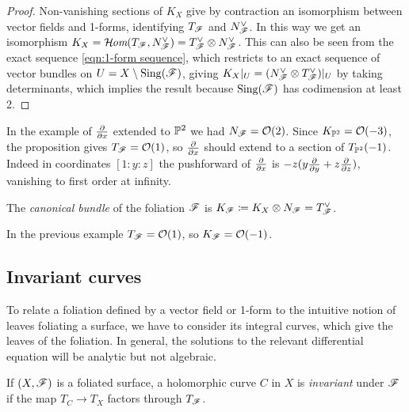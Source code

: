 \begin{proof}
    Non-vanishing sections of $K_X$ give by contraction an isomorphism between
    vector fields and 1-forms, identifying $T_\scrF$ and $N_\scrF^\vee$. In this
    way we get an isomorphism
    $K_X=\shHom(T_\scrF,N_\scrF^\vee)=T_\scrF^\vee\otimes N_\scrF^\vee$. This can also be
    seen from the exact sequence \cref{eqn:1-form sequence}, which restricts to
    an exact sequence of vector bundles on $U=X\setminus\Sing(\scrF)$, giving
    $K_X|_U=(N_\scrF^\vee\otimes T_\scrF^\vee)|_U$ by taking determinants, which
    implies the result because $\Sing(\scrF)$ has codimension at least 2.
\end{proof}

\begin{example}\label{ex:P2 tangent}
    In the example of $\pdv{}{x}$ extended to $\P^2$ we had $N_\scrF=\O(2)$.
    Since $K_{\P^2}=\O(-3)$, the proposition gives $T_\scrF=\O(1)$, so
    $\pdv{}{x}$ should extend to a section of $T_{\P^2}(-1)$. Indeed in
    coordinates $[1:y:z]$ the pushforward of $\pdv{}{x}$ is
    $-z(y\pdv{}{y}+z\pdv{}{z})$, vanishing to first order at infinity.
\end{example}

\begin{definition}
    The \emph{canonical bundle} of the foliation $\scrF$ is
    $K_\scrF\coloneqq K_X\otimes N_\scrF=T_\scrF^\vee$.
\end{definition}

\begin{example}
    In the previous example $T_\scrF=\O(1)$, so $K_\scrF=\O(-1)$.
\end{example}

\subsection{Invariant curves}

To relate a foliation defined by a vector field or 1-form to the intuitive
notion of leaves foliating a surface, we have to consider its integral curves,
which give the leaves of the foliation. In general, the solutions to the
relevant differential equation will be analytic but not algebraic.

\begin{definition}
    If $(X,\scrF)$ is a foliated surface, a holomorphic curve $C$ in $X$ is
    \emph{invariant} under $\scrF$ if the map $T_C\to T_X$ factors through
    $T_\scrF$.
\end{definition}

